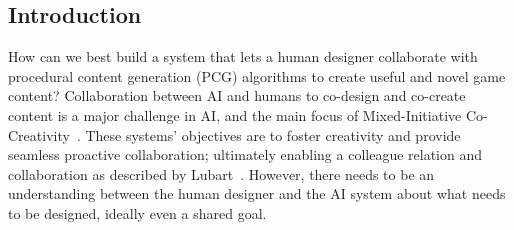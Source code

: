 \subsection{Introduction}




How can we best build a system that lets a human designer collaborate with procedural content generation (PCG) algorithms to create useful and novel game content? Collaboration between AI and humans to co-design and co-create content is a major challenge in AI, and the main focus of Mixed-Initiative Co-Creativity~\cite{p10yannakakis2014micc,liapis2016mixed}. These systems' objectives are to foster creativity and provide seamless proactive collaboration; ultimately enabling a colleague relation and collaboration as described by Lubart~\cite{p10LUBART2005-computerPartners}. However, there needs to be an understanding between the human designer and the AI system about what needs to be designed, ideally even a shared goal.



